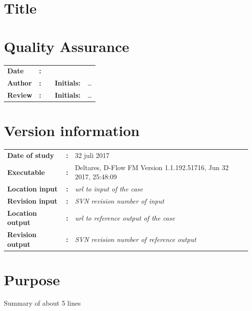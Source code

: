 

\section{Title}
\newrefsegment

\section*{Quality Assurance}
\begin{tabular}{@{}p{27mm}@{}p{0mm}p{\textwidth-52mm-48pt}p{15mm}p{10mm}}
\textbf{Date} & \textbf{:} &   \\ 
\textbf{Author} & \textbf{:} &   & \textbf{Initials:} & \ldots \\ 
\textbf{Review} & \textbf{:} &   & \textbf{Initials:} & \ldots
\end{tabular}

\section*{Version information}
{{
\begin{tabular}{@{}p{27mm}@{}p{0mm}p{\textwidth-27mm-24pt}}
\textbf{Date of study}& \textbf{:} & 32 juli 2017 \\
\textbf{Executable}   & \textbf{:} & Deltares, D-Flow FM Version 1.1.192.51716, Jun 32 2017, 25:48:09  \\
\textbf{Location input}     & \textbf{:} & \emph{url to input of the case} \\
\textbf{Revision input} & \textbf{:} & \emph{SVN revision number of input} \\
\textbf{Location output}     & \textbf{:} & \emph{url to reference output of the case} \\
\textbf{Revision output} & \textbf{:} & \emph{SVN revision number of reference output}
\end{tabular}
}}

\section*{Purpose}
Summary of about 5 lines

